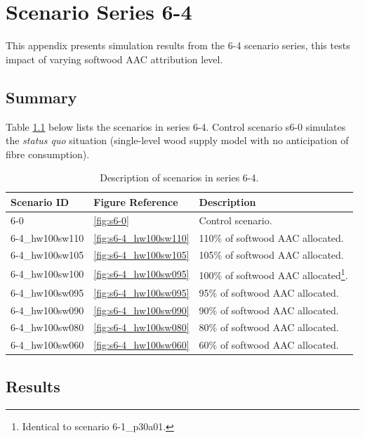 \chapter{Scenario Series 6-4}

This appendix presents simulation results from the 6-4 scenario series, this tests impact of varying softwood AAC attribution level. 

\section{Summary}
Table \ref{tab:scenario_list} below lists the scenarios in series 6-4. 
Control scenario s6-0 simulates the \emph{status quo} situation (single-level wood supply model with no anticipation of fibre consumption).  

\begin{table}
  \centering
  \begin{tabular}{lll}
    \hline
    Scenario ID & Figure Reference & Description \\
    \hline
    6-0 & \ref{fig:s6-0} & Control scenario. \\
    6-4\_hw100sw110 & \ref{fig:s6-4_hw100sw110} & 110$\%$ of softwood AAC allocated. \\
    6-4\_hw100sw105 & \ref{fig:s6-4_hw100sw105} & 105\% of softwood AAC allocated. \\
    6-4\_hw100sw100 & \ref{fig:s6-4_hw100sw095} & 100$\%$ of softwood AAC allocated\footnote{Identical to scenario 6-1\_p30a01.}. \\
    6-4\_hw100sw095 & \ref{fig:s6-4_hw100sw095} & 95$\%$ of softwood AAC allocated. \\
    6-4\_hw100sw090 & \ref{fig:s6-4_hw100sw090} & 90\% of softwood AAC allocated. \\
    6-4\_hw100sw080 & \ref{fig:s6-4_hw100sw080} & 80\% of softwood AAC allocated. \\
    6-4\_hw100sw060 & \ref{fig:s6-4_hw100sw060} & 60\% of softwood AAC allocated. \\
    \hline
  \end{tabular}
  \caption{Description of scenarios in series 6-4.}
  \label{tab:scenario_list}
\end{table}

\section{Results}

